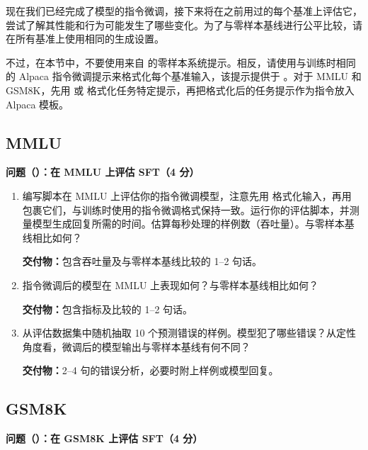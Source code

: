 现在我们已经完成了模型的指令微调，接下来将在之前用过的每个基准上评估它，尝试了解其性能和行为可能发生了哪些变化。为了与零样本基线进行公平比较，请在所有基准上使用相同的生成设置。

不过，在本节中，不要使用来自  的零样本系统提示。相反，请使用与训练时相同的 Alpaca 指令微调提示来格式化每个基准输入，该提示提供于 。对于 MMLU 和 GSM8K，先用  或  格式化任务特定提示，再把格式化后的任务提示作为指令放入 Alpaca 模板。

\subsection{MMLU}

\medskip
\noindent\textbf{问题（）：在 MMLU 上评估 SFT（4 分）}
\medskip

\begin{enumerate}[label=(\alph*)]
  \item 编写脚本在 MMLU 上评估你的指令微调模型，注意先用  格式化输入，再用  包裹它们，与训练时使用的指令微调格式保持一致。运行你的评估脚本，并测量模型生成回复所需的时间。估算每秒处理的样例数（吞吐量）。与零样本基线相比如何？

  \textbf{交付物：}包含吞吐量及与零样本基线比较的 1--2 句话。
  \item 指令微调后的模型在 MMLU 上表现如何？与零样本基线相比如何？

  \textbf{交付物：}包含指标及比较的 1--2 句话。
  \item 从评估数据集中随机抽取 10 个预测错误的样例。模型犯了哪些错误？从定性角度看，微调后的模型输出与零样本基线有何不同？

  \textbf{交付物：}2--4 句的错误分析，必要时附上样例或模型回复。
\end{enumerate}

\subsection{GSM8K}

\medskip
\noindent\textbf{问题（）：在 GSM8K 上评估 SFT（4 分）}
\medskip

